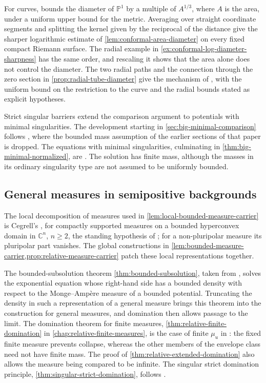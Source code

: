 For curves, \cite[v1, Lemma~4.1, p.~17]{GM26} bounds the diameter of $\mathbb P^1$ by a multiple of $A^{1/3}$, where $A$ is the area, under a uniform upper bound for the metric. Averaging over straight coordinate segments and splitting the kernel given by the reciprocal of the distance give the sharper logarithmic estimate of \cref{lem:conformal-area-diameter} on every fixed compact Riemann surface. The radial example in \cref{ex:conformal-log-diameter-sharpness} has the same order, and rescaling it shows that the area alone does not control the diameter. The two radial paths and the connection through the zero section in \cref{prop:radial-tube-diameter} give the mechanism of \cite[v1, Proposition~4.2, pp.~20--21]{GM26}, with the uniform bound on the restriction to the curve and the radial bounds stated as explicit hypotheses.

Strict singular barriers extend the comparison argument to potentials with minimal singularities. The development starting in \cref{sec:big-minimal-comparison} follows \cite[Section 4]{BGL25}, where the bounded mass assumption of the earlier sections of that paper is dropped. The equations with minimal singularities, culminating in \cref{thm:big-minimal-normalized}, are \cite[Theorems 4.6--4.7]{BGL25}. The solution has finite mass, although the masses in its ordinary singularity type are not assumed to be uniformly bounded.

\subsection{General measures in semipositive backgrounds}

The local decomposition of measures used in \cref{lem:local-bounded-measure-carrier} is Cegrell's \cite[Theorem~6.3, p.~209]{Ceg98}, for compactly supported measures on a bounded hyperconvex domain in $\mathbb C^n$, $n\geq2$, the standing hypothesis of \cite[Section~2, p.~188]{Ceg98}; for a non-pluripolar measure its pluripolar part vanishes. The global constructions in \cref{lem:bounded-measure-carrier,prop:relative-measure-carrier} patch these local representations together.

The bounded-subsolution theorem \cref{thm:bounded-subsolution}, taken from \cite[Theorem~5.1, pp.~27--28]{ALS26}, solves the exponential equation whose right-hand side has a bounded density with respect to the Monge--Amp\`ere measure of a bounded potential. Truncating the density in such a representation of a general measure brings this theorem into the construction for general measures, and domination then allows passage to the limit. The domination theorem for finite measures, \cref{thm:relative-finite-domination} in \cref{chap:relative-finite-measures}, is the case of finite $\mu_u$ in \cite[Theorem~3.14, p.~22]{ALS26}: the fixed finite measure prevents collapse, whereas the other members of the envelope class need not have finite mass. The proof of \cref{thm:relative-extended-domination} also allows the measure being compared to be infinite. The singular strict domination principle, \cref{thm:singular-strict-domination}, follows \cite[Theorem~3.11, p.~21]{ALS26}.

